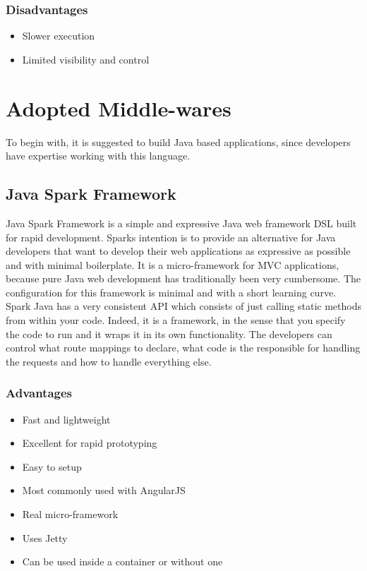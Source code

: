 \documentclass[a4paper, hidelinks, 12pt]{report}
\begin{document}
\subsubsection{Disadvantages}
\begin{itemize}
\item{} Slower execution
\item{} Limited visibility and control
\end{itemize}

	\section{Adopted Middle-wares}
	To begin with, it is suggested to build Java based applications, since developers have expertise working with this language.

\subsection{Java Spark Framework}
Java Spark Framework is a simple and expressive Java web framework DSL built for rapid development. Sparks intention is to provide an alternative for Java developers that want to develop their web applications as expressive as possible and with minimal boilerplate. It is a micro-framework for MVC applications, because pure Java web development has traditionally been very cumbersome. The configuration for this framework is minimal and with a short learning curve.\\

Spark Java has a very consistent API which consists of just calling static methods from within your code. Indeed, it is a framework, in the sense that you specify the code to run and it wraps it in its own functionality. The developers can control what route mappings to declare, what code is the responsible for handling the requests and how to handle everything else.

\subsubsection{Advantages}
		\begin{itemize}
		\item{} Fast and lightweight
	\item{} Excellent for rapid prototyping
	\item{} Easy to setup
	\item{} Most commonly used with AngularJS
	\item{} Real micro-framework
	\item{} Uses Jetty
	\item{} Can be used inside a container or without one
		\end{itemize}
\end{document}

